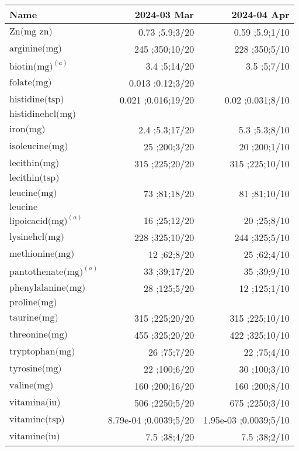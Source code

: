 \begin{table}[H]
\centering
\begin{tabular}{|l|r|r|}
\hline
Name&2024-03 Mar&2024-04 Apr\\
\hline
$\textrm{Zn(mg~zn)}$&0.73 ;5.9;3/20&0.59 ;5.9;1/10\\
$\textrm{arginine(mg)}$&245 ;350;10/20&228 ;350;5/10\\
$\textrm{biotin(mg)}^{\left(a\right)}$&3.4 ;5;14/20&3.5 ;5;7/10\\
$\textrm{folate(mg)}$&0.013 ;0.12;3/20&\\
$\textrm{histidine(tsp)}$&0.021 ;0.016;19/20&0.02 ;0.031;8/10\\
$\textrm{histidinehcl(mg)}$&&\\
$\textrm{iron(mg)}$&2.4 ;5.3;17/20&5.3 ;5.3;8/10\\
$\textrm{isoleucine(mg)}$&25 ;200;3/20&20 ;200;1/10\\
$\textrm{lecithin(mg)}$&315 ;225;20/20&315 ;225;10/10\\
$\textrm{lecithin(tsp)}$&&\\
$\textrm{leucine(mg)}$&73 ;81;18/20&81 ;81;10/10\\
$\textrm{leucine}$&&\\
$\textrm{lipoicacid(mg)}^{\left(a\right)}$&16 ;25;12/20&20 ;25;8/10\\
$\textrm{lysinehcl(mg)}$&228 ;325;10/20&244 ;325;5/10\\
$\textrm{methionine(mg)}$&12 ;62;8/20&25 ;62;4/10\\
$\textrm{pantothenate(mg)}^{\left(a\right)}$&33 ;39;17/20&35 ;39;9/10\\
$\textrm{phenylalanine(mg)}$&28 ;125;5/20&12 ;125;1/10\\
$\textrm{proline(mg)}$&&\\
$\textrm{taurine(mg)}$&315 ;225;20/20&315 ;225;10/10\\
$\textrm{threonine(mg)}$&455 ;325;20/20&422 ;325;10/10\\
$\textrm{tryptophan(mg)}$&26 ;75;7/20&22 ;75;4/10\\
$\textrm{tyrosine(mg)}$&22 ;100;6/20&30 ;100;3/10\\
$\textrm{valine(mg)}$&160 ;200;16/20&160 ;200;8/10\\
$\textrm{vitamina(iu)}$&506 ;2250;5/20&675 ;2250;3/10\\
$\textrm{vitaminc(tsp)}$&8.79e-04 ;0.0039;5/20&1.95e-03 ;0.0039;5/10\\
$\textrm{vitamine(iu)}$&7.5 ;38;4/20&7.5 ;38;2/10\\

\end{tabular}
\end{table}
